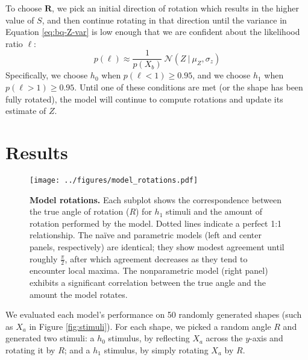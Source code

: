 \documentclass{article} %
\newcommand{\naive}[0]{na\"ive}
\begin{document}
To choose $\mathbf{R}$, we pick an initial direction of rotation which
results in the higher value of $S$, and then continue rotating in that
direction until the variance in Equation \ref{eq:bq-Z-var} is low
enough that we are confident about the likelihood ratio $\ell$:
\begin{equation*}
p(\ell)\approx\frac{1}{p(X_b)}\ \mathcal{N}(Z\ \vert\ \mu_Z, \sigma_z)
\end{equation*}
Specifically, we choose $h_0$ when $p(\ell < 1)\geq 0.95$, and we
choose $h_1$ when $p(\ell > 1)\geq 0.95$. Until one of these
conditions are met (or the shape has been fully rotated), the model
will continue to compute rotations and update its estimate of $Z$.

\section{Results}

\begin{figure}[t]
  \centering
  \texttt{[image: ../figures/model\_rotations.pdf]}
  \caption{\textbf{Model rotations.} Each subplot shows the
    correspondence between the true angle of rotation ($R$) for $h_1$
    stimuli and the amount of rotation performed by the model. Dotted
    lines indicate a perfect 1:1 relationship. The \naive{} and
    parametric models (left and center panels, respectively) are
    identical; they show modest agreement until roughly
    $\frac{\pi}{2}$, after which agreement decreases as they tend to
    encounter local maxima. The nonparametric model (right panel)
    exhibits a significant correlation between the true angle and the
    amount the model rotates.}
  \label{fig:rotations}
\end{figure}

We evaluated each model's performance on 50 randomly generated shapes
(such as $X_a$ in Figure \ref{fig:stimuli}). For each shape, we picked
a random angle $R$ and generated two stimuli: a $h_0$ stimulus, by
reflecting $X_a$ across the $y$-axis and rotating it by $R$; and a
$h_1$ stimulus, by simply rotating $X_a$ by $R$.
\end{document}
